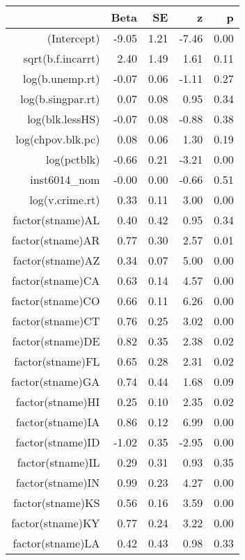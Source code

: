 \begin{table}[ht]
\centering
\begin{tabular}{rrrrr}
  \hline
 & Beta & SE & z & p \\ 
  \hline
(Intercept) & -9.05 & 1.21 & -7.46 & 0.00 \\ 
  sqrt(b.f.incarrt) & 2.40 & 1.49 & 1.61 & 0.11 \\ 
  log(b.unemp.rt) & -0.07 & 0.06 & -1.11 & 0.27 \\ 
  log(b.singpar.rt) & 0.07 & 0.08 & 0.95 & 0.34 \\ 
  log(blk.lessHS) & -0.07 & 0.08 & -0.88 & 0.38 \\ 
  log(chpov.blk.pc) & 0.08 & 0.06 & 1.30 & 0.19 \\ 
  log(pctblk) & -0.66 & 0.21 & -3.21 & 0.00 \\ 
  inst6014\_nom & -0.00 & 0.00 & -0.66 & 0.51 \\ 
  log(v.crime.rt) & 0.33 & 0.11 & 3.00 & 0.00 \\ 
  factor(stname)AL & 0.40 & 0.42 & 0.95 & 0.34 \\ 
  factor(stname)AR & 0.77 & 0.30 & 2.57 & 0.01 \\ 
  factor(stname)AZ & 0.34 & 0.07 & 5.00 & 0.00 \\ 
  factor(stname)CA & 0.63 & 0.14 & 4.57 & 0.00 \\ 
  factor(stname)CO & 0.66 & 0.11 & 6.26 & 0.00 \\ 
  factor(stname)CT & 0.76 & 0.25 & 3.02 & 0.00 \\ 
  factor(stname)DE & 0.82 & 0.35 & 2.38 & 0.02 \\ 
  factor(stname)FL & 0.65 & 0.28 & 2.31 & 0.02 \\ 
  factor(stname)GA & 0.74 & 0.44 & 1.68 & 0.09 \\ 
  factor(stname)HI & 0.25 & 0.10 & 2.35 & 0.02 \\ 
  factor(stname)IA & 0.86 & 0.12 & 6.99 & 0.00 \\ 
  factor(stname)ID & -1.02 & 0.35 & -2.95 & 0.00 \\ 
  factor(stname)IL & 0.29 & 0.31 & 0.93 & 0.35 \\ 
  factor(stname)IN & 0.99 & 0.23 & 4.27 & 0.00 \\ 
  factor(stname)KS & 0.56 & 0.16 & 3.59 & 0.00 \\ 
  factor(stname)KY & 0.77 & 0.24 & 3.22 & 0.00 \\ 
  factor(stname)LA & 0.42 & 0.43 & 0.98 & 0.33 \\ 

\end{tabular}
\end{table}
